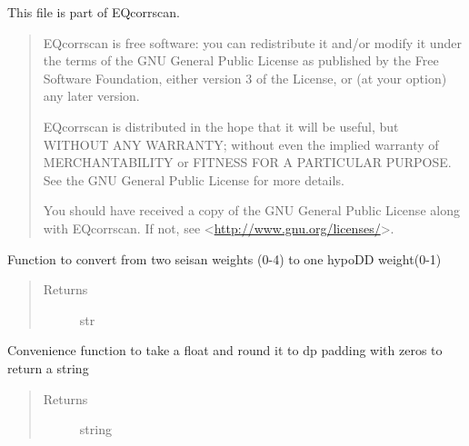 \documentclass[a4paper,10pt,english]{sphinxmanual}
\begin{document}
This file is part of EQcorrscan.
\begin{quote}

EQcorrscan is free software: you can redistribute it and/or modify
it under the terms of the GNU General Public License as published by
the Free Software Foundation, either version 3 of the License, or
(at your option) any later version.

EQcorrscan is distributed in the hope that it will be useful,
but WITHOUT ANY WARRANTY; without even the implied warranty of
MERCHANTABILITY or FITNESS FOR A PARTICULAR PURPOSE.  See the
GNU General Public License for more details.

You should have received a copy of the GNU General Public License
along with EQcorrscan.  If not, see \textless{}\href{http://www.gnu.org/licenses/}{http://www.gnu.org/licenses/}\textgreater{}.
\end{quote}

\begin{fulllineitems}
\label{utils:catalogue2DD._av_weight}
Function to convert from two seisan weights (0-4) to one hypoDD weight(0-1)
\begin{quote}\begin{description}
\item[{Returns}] \leavevmode
str

\end{description}\end{quote}

\end{fulllineitems}


\begin{fulllineitems}
\label{utils:catalogue2DD._cc_round}
Convenience function to take a float and round it to dp padding with zeros
to return a string
\begin{quote}\begin{description}
\item[{Returns}] \leavevmode
string

\end{description}\end{quote}

\end{fulllineitems}
\end{document}
